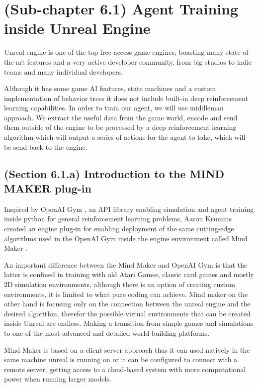 \documentclass[a4paper,one side,12pt]{book}
\begin{document}
\section{(Sub-chapter 6.1) Agent Training inside Unreal Engine}

Unreal engine is one of the top free-access game engines, boasting many state-of-the-art features and a very active developer community, from big studios to indie teams and many individual developers.

Although it has some game AI features, state machines and a custom
implementation of behavior trees it does not include built-in deep
reinforcement learning capabilities. In order to train our agent, we
will use middleman approach. We extract the useful data from the game
world, encode and send them outside of the engine to be processed by a
deep reinforcement learning algorithm which will output a series of
actions for the agent to take, which will be send back to the engine.

\subsection{(Section 6.1.a) Introduction to the MIND MAKER plug-in}

Inspired by OpenAI Gym \cite{gym_openAI}, an API library enabling simulation and agent training inside python for general reinforcement learning
problems, Aaron Krumins created an engine plug-in for enabling
deployment of the same cutting-edge algorithms used in the OpenAI Gym
inside the engine environment called Mind Maker \cite{mindmaker}.

An important difference between the Mind Maker and OpenAI Gym is that
the latter is confined in training with old Atari Games, classic card
games and mostly 2D simulation environments, although there is an option of creating custom environments, it is limited to what pure coding can achieve. Mind maker on the other hand is focusing only on the connection between the unreal engine and the desired algorithm, therefor the possible virtual environments that can be created inside Unreal are endless. Making a transition from simple games and simulations to one of the most advanced and detailed world building platforms.

Mind Maker is based on a client-server approach thus it can used
natively in the same machine unreal is running on or it can be
configured to connect with a remote server, getting access to a
cloud-based system with more computational power when running larger
models.
\end{document}
